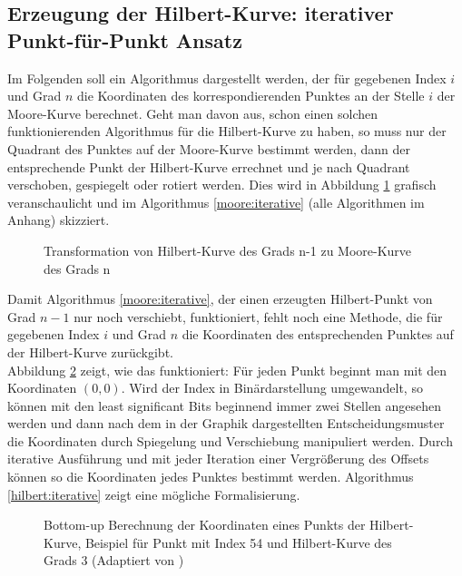 \documentclass[course=erap]{aspdoc}
\begin{document}
\subsection{Erzeugung der Hilbert-Kurve: iterativer Punkt-für-Punkt Ansatz}
Im Folgenden soll ein Algorithmus dargestellt werden, der für gegebenen Index $i$ und Grad $n$ die Koordinaten des korrespondierenden Punktes an der Stelle $i$ der Moore-Kurve berechnet.
Geht man davon aus, schon einen solchen funktionierenden Algorithmus für die Hilbert-Kurve zu haben, so muss nur der Quadrant des Punktes auf der Moore-Kurve bestimmt werden, dann der entsprechende Punkt der Hilbert-Kurve errechnet und je nach Quadrant verschoben, gespiegelt oder rotiert werden. Dies wird in Abbildung \ref{HilbertZuMoore} grafisch veranschaulicht und im Algorithmus \ref{moore:iterative} (alle Algorithmen im Anhang) skizziert.
\begin{figure}[h]
\centering
\def\svgwidth{240pt}

\caption{Transformation von Hilbert-Kurve des Grads n-1 zu Moore-Kurve des Grads n}
\label{HilbertZuMoore}
\end{figure}
Damit Algorithmus \ref{moore:iterative}, der einen erzeugten Hilbert-Punkt von Grad $n-1$ nur noch verschiebt, funktioniert, fehlt noch eine Methode, die für gegebenen Index $i$ und Grad $n$ die Koordinaten des entsprechenden Punktes auf der Hilbert-Kurve zurückgibt. \\
Abbildung \ref{fig:hilbertBuildup} zeigt, wie das funktioniert: Für jeden Punkt beginnt man mit den Koordinaten $(0, 0)$. Wird der Index in Binärdarstellung umgewandelt, so können mit den least significant Bits beginnend immer zwei Stellen angesehen werden und dann nach dem in der Graphik dargestellten Entscheidungsmuster die Koordinaten durch Spiegelung und Verschiebung manipuliert werden. Durch iterative Ausführung und mit jeder Iteration einer Vergrößerung des Offsets können so die Koordinaten jedes Punktes bestimmt werden. \cite{Chwedzuk2016} Algorithmus \ref{hilbert:iterative} zeigt eine mögliche Formalisierung.

\begin{figure}[h]
    \centering
    \caption{Bottom-up Berechnung der Koordinaten eines Punkts der Hilbert-Kurve, Beispiel für Punkt mit Index 54 und Hilbert-Kurve des Grads 3 (Adaptiert von \cite{Chwedzuk2016})}%
    \label{fig:hilbertBuildup}%
\end{figure}
\end{document}
